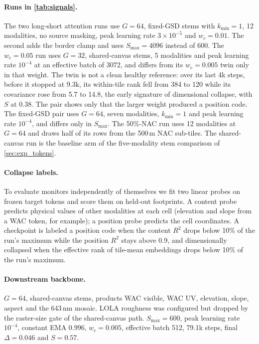 \paragraph{Runs in \cref{tab:signals}.} The two long-short attention runs use $G{=}64$, fixed-GSD stems with $k_{\min}{=}1$, 12 modalities, no source masking, peak learning rate $3{\times}10^{-5}$ and $w_c{=}0.01$. The second adds the border clamp and uses $S_{\max}{=}4096$ instead of 600. The $w_c{=}0.05$ run uses $G{=}32$, shared-canvas stems, 5 modalities and peak learning rate $10^{-4}$ at an effective batch of 3072, and differs from its $w_c{=}0.005$ twin only in that weight. The twin is not a clean healthy reference: over its last 4k steps, before it stopped at 9.3k, its within-tile rank fell from 384 to 120 while its covariance rose from 5.7 to 14.8, the early signature of dimensional collapse, with $S$ at 0.38. The pair shows only that the larger weight produced a position code. The fixed-GSD pair uses $G{=}64$, seven modalities, $k_{\min}{=}1$ and peak learning rate $10^{-4}$, and differs only in $S_{\max}$. The 50\%-NAC run uses 12 modalities at $G{=}64$ and draws half of its rows from the 500\,m NAC sub-tiles. The shared-canvas run is the baseline arm of the five-modality stem comparison of \cref{sec:exp_tokens}.

\paragraph{Collapse labels.} To evaluate monitors independently of themselves we fit two linear probes on frozen target tokens and score them on held-out footprints. A content probe predicts physical values of other modalities at each cell (elevation and slope from a WAC token, for example); a position probe predicts the cell coordinates. A checkpoint is labeled a position code when the content $R^2$ drops below 10\% of the run's maximum while the position $R^2$ stays above 0.9, and dimensionally collapsed when the effective rank of tile-mean embeddings drops below 10\% of the run's maximum.

\paragraph{Downstream backbone.} $G{=}64$, shared-canvas stems, products WAC visible, WAC UV, elevation, slope, aspect and the 643\,nm mosaic. LOLA roughness was configured but dropped by the raster-size gate of the shared-canvas path. $S_{\max}{=}600$, peak learning rate $10^{-4}$, constant EMA 0.996, $w_c{=}0.005$, effective batch 512, 79.1k steps, final $\Delta{=}0.046$ and $S{=}0.57$.

